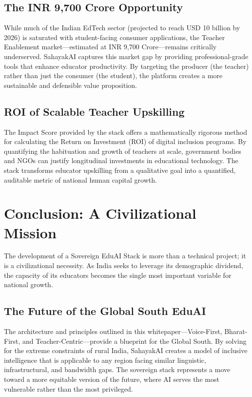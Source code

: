\documentclass[11pt,a4paper]{article}
\begin{document}
\subsection{The INR 9,700 Crore Opportunity}
While much of the Indian EdTech sector (projected to reach USD 10 billion by 2026) is saturated with student-facing consumer applications, the Teacher Enablement market---estimated at INR 9,700 Crore---remains critically underserved. SahayakAI captures this market gap by providing professional-grade tools that enhance educator productivity. By targeting the producer (the teacher) rather than just the consumer (the student), the platform creates a more sustainable and defensible value proposition.

\subsection{ROI of Scalable Teacher Upskilling}
The Impact Score provided by the stack offers a mathematically rigorous method for calculating the Return on Investment (ROI) of digital inclusion programs. By quantifying the habituation and growth of teachers at scale, government bodies and NGOs can justify longitudinal investments in educational technology. The stack transforms educator upskilling from a qualitative goal into a quantified, auditable metric of national human capital growth.

\section{Conclusion: A Civilizational Mission}
The development of a Sovereign EduAI Stack is more than a technical project; it is a civilizational necessity. As India seeks to leverage its demographic dividend, the capacity of its educators becomes the single most important variable for national growth.

\subsection{The Future of the Global South EduAI}
The architecture and principles outlined in this whitepaper---Voice-First, Bharat-First, and Teacher-Centric---provide a blueprint for the Global South. By solving for the extreme constraints of rural India, SahayakAI creates a model of inclusive intelligence that is applicable to any region facing similar linguistic, infrastructural, and bandwidth gaps. The sovereign stack represents a move toward a more equitable version of the future, where AI serves the most vulnerable rather than the most privileged.
\end{document}
